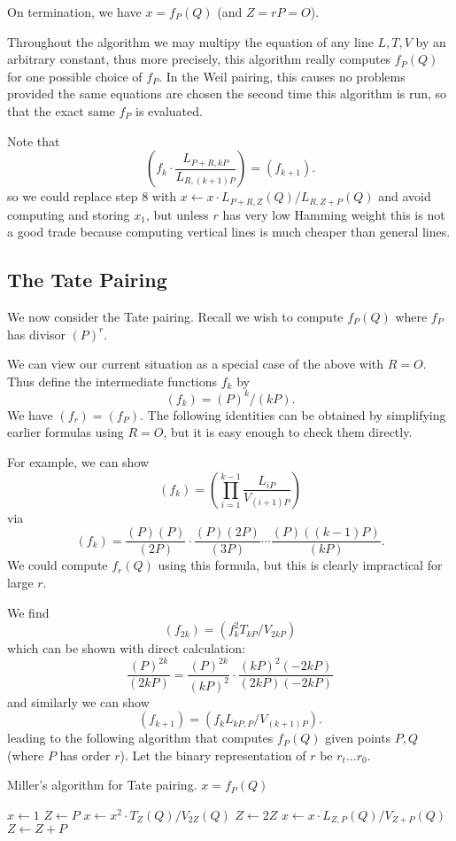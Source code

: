 On termination, we have $x = f_P(Q)$ (and $Z = rP = O$).

Throughout the algorithm we may multipy the equation of any line $L, T, V$
by an arbitrary constant, thus more precisely, this algorithm
really computes $f_P(Q)$ for one possible choice of $f_P$.
In the Weil pairing,
this causes no problems provided the same equations are chosen the second
time this algorithm is run, so that the exact same $f_P$ is evaluated.

Note that
\[
\left(
f_k \cdot \frac{L_{P+R,kP}}{L_{R,(k+1)P}}
\right) = (f_{k+1}) .
\]
so we could replace step 8 with
$x \gets x \cdot L_{P+R, Z}(Q) / L_{R,Z+P}(Q)$
and avoid computing and storing $x_1$, but unless
$r$ has very low Hamming weight this is not a good trade
because computing vertical lines is much cheaper than general lines.

\subsection {The Tate Pairing}

We now consider the Tate pairing. Recall we wish to compute
$f_P(Q)$ where $f_P$ has divisor $(P)^r$.

We can view our current situation as a special case of the above
with $R = O$.
Thus define the intermediate functions $f_k$ by
\[ (f_k) = (P)^k / (kP) . \]
We have $(f_r) = (f_P)$.
The following identities can be obtained by simplifying
earlier formulas using $R=O$, but it is easy enough to check them directly.

For example, we can show
\[ (f_k) = \left(\prod_{i=1}^{k-1} \frac{L_{iP}}{V_{(i+1)P}}\right) \]
via
\[ (f_k) =
\frac{(P)(P)}{(2P)}
\cdot
\frac{(P)(2P)}{(3P)}
\cdots
\frac{(P)((k-1)P)}{(kP)} .
\]
We could compute $f_r(Q)$ using this formula,
but this is clearly impractical for large $r$.

We find
\[
(f_{2k}) = (f_k^2 T_{kP} / V_{2kP} )
\]
which can be shown with direct calculation:
\[
\frac{(P)^{2k}}{(2kP)} =
\frac{(P)^{2k}}{(kP)^2} \cdot
\frac{(kP)^2 (-2kP)}{(2kP)(-2kP)}
\]
and similarly we can show
\[
(f_{k+1}) = (f_k L_{kP,P} / V_{(k+1)P}).
\]
leading to the following algorithm that
computes $f_P(Q)$ given points $P,Q$ (where $P$ has order $r$).
Let the binary representation of $r$ be $r_t ... r_0$.

\begin{algorithm}
\caption{Miller's algorithm for Tate pairing. $x = f_P(Q)$}
\begin{algorithmic}[1]
\STATE $x \gets 1$
\STATE $Z \gets P$
    \STATE $x \gets x^2 \cdot T_Z(Q) / V_{2Z}(Q)$
    \STATE $Z \gets 2Z$
	\STATE $x \gets x \cdot L_{Z,P}(Q) / V_{Z+P}(Q)$
	\STATE $Z \gets Z + P$
    \ENDIF
\ENDFOR
\end{algorithmic}
\end{algorithm}

